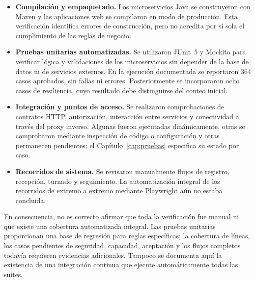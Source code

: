 \begin{itemize}
    \item \textbf{Compilación y empaquetado.} Los microservicios Java se construyeron
    con Maven y las aplicaciones web se compilaron en modo de producción. Esta
    verificación identifica errores de construcción, pero no acredita por sí sola
    el cumplimiento de las reglas de negocio.
    \item \textbf{Pruebas unitarias automatizadas.} Se utilizaron JUnit~5 y Mockito
    para verificar lógica y validaciones de los microservicios sin depender de la
    base de datos ni de servicios externos. En la ejecución documentada se reportaron
    364 casos aprobados, sin fallas ni errores. Posteriormente se incorporaron
    ocho casos de resiliencia, cuyo resultado debe distinguirse del conteo inicial.
    \item \textbf{Integración y puntos de acceso.} Se realizaron comprobaciones
    de contratos HTTP, autorización, interacción entre servicios y conectividad a
    través del proxy inverso. Algunas fueron ejecutadas dinámicamente, otras se
    comprobaron mediante inspección de código o configuración y otras permanecen
    pendientes; el Capítulo~\ref{cap:pruebas} especifica su estado por caso.
    \item \textbf{Recorridos de sistema.} Se revisaron manualmente flujos de
    registro, recepción, turnado y seguimiento. La automatización integral de los
    recorridos de extremo a extremo mediante Playwright aún no estaba concluida.
\end{itemize}

En consecuencia, no es correcto afirmar que toda la verificación fue manual ni
que existe una cobertura automatizada integral. Las pruebas unitarias proporcionan
una base de regresión para reglas específicas; la cobertura de líneas, los casos
pendientes de seguridad, capacidad, aceptación y los flujos completos todavía
requieren evidencias adicionales. Tampoco se documenta aquí la existencia de una
integración continua que ejecute automáticamente todas las suites.

